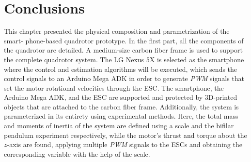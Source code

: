\section{Conclusions}
This chapter presented the physical composition and parametrization of the smart- phone-based quadrotor prototype. In the first part, all the components of the quadrotor are detailed. A medium-size carbon fiber frame is used to support the complete quadrotor system. The LG Nexus 5X is selected as the smartphone where the control and estimation algorithms will be executed, which sends the control signals to an Arduino Mega ADK in order to generate \textit{PWM} signals that set the motor rotational velocities through the ESC. The smartphone, the Arduino Mega ADK, and the ESC are supported and protected by 3D-printed objects that are attached to the carbon fiber frame. Additionally, the system is parameterized in its entirety using experimental methods. Here, the total mass and moments of inertia of the system are defined using a scale and the bifilar pendulum experiment respectively, while the motor's thrust and torque about the $z$-axis are found, applying multiple \textit{PWM} signals to the ESCs and obtaining the corresponding variable with the help of the scale.